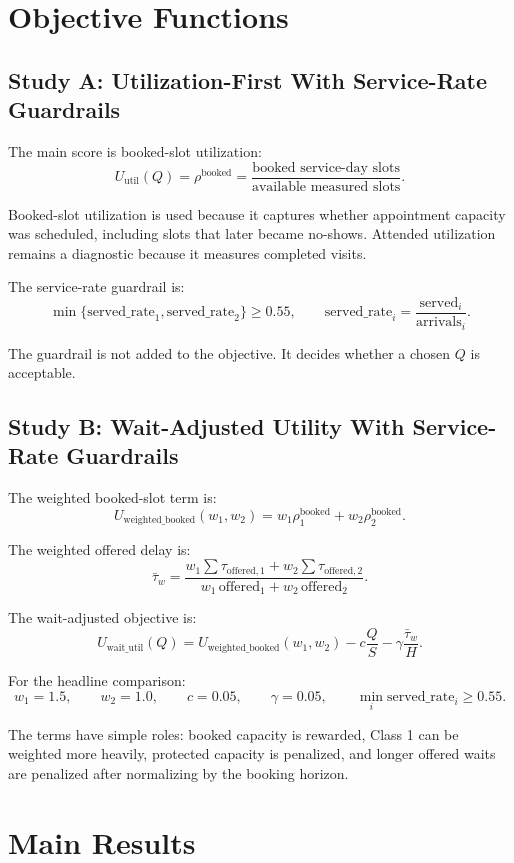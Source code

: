 \documentclass[11pt]{article}
\newcommand{\servedrate}{\mathrm{served\_rate}}
\newcommand{\bookedrho}{\rho^{\mathrm{booked}}}
\begin{document}
\section{Objective Functions}

\subsection{Study A: Utilization-First With Service-Rate Guardrails}

The main score is booked-slot utilization:
\[
  U_{\mathrm{util}}(Q)=\bookedrho
  =\frac{\text{booked service-day slots}}{\text{available measured slots}}.
\]

Booked-slot utilization is used because it captures whether appointment capacity was scheduled,
including slots that later became no-shows. Attended utilization remains a diagnostic because it
measures completed visits.

The service-rate guardrail is:
\[
  \min\{\servedrate_1,\servedrate_2\} \ge 0.55,
  \qquad
  \servedrate_i=\frac{\text{served}_i}{\text{arrivals}_i}.
\]

The guardrail is not added to the objective. It decides whether a chosen $Q$ is acceptable.

\subsection{Study B: Wait-Adjusted Utility With Service-Rate Guardrails}

The weighted booked-slot term is:
\[
  U_{\mathrm{weighted\_booked}}(w_1,w_2)
  = w_1\bookedrho_1+w_2\bookedrho_2.
\]

The weighted offered delay is:
\[
  \bar{\tau}_w
  =
  \frac{
    w_1\sum \tau_{\mathrm{offered},1}
    +w_2\sum \tau_{\mathrm{offered},2}
  }{
    w_1\,\mathrm{offered}_1+w_2\,\mathrm{offered}_2
  }.
\]

The wait-adjusted objective is:
\[
  U_{\mathrm{wait\_util}}(Q)
  =
  U_{\mathrm{weighted\_booked}}(w_1,w_2)
  - c\frac{Q}{S}
  - \gamma\frac{\bar{\tau}_w}{H}.
\]

For the headline comparison:
\[
  w_1=1.5,\qquad w_2=1.0,\qquad c=0.05,\qquad \gamma=0.05,
  \qquad \min_i \servedrate_i \ge 0.55.
\]

The terms have simple roles: booked capacity is rewarded, Class 1 can be weighted more heavily,
protected capacity is penalized, and longer offered waits are penalized after normalizing by the
booking horizon.

\section{Main Results}
\end{document}

